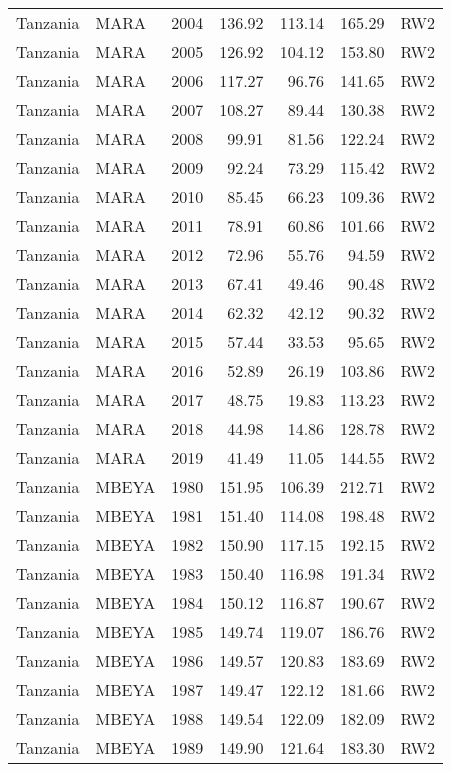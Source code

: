 \begin{longtable}{lllrrrl}
  Tanzania & MARA & 2004 & 136.92 & 113.14 & 165.29 & RW2 \\ 
  Tanzania & MARA & 2005 & 126.92 & 104.12 & 153.80 & RW2 \\ 
  Tanzania & MARA & 2006 & 117.27 & 96.76 & 141.65 & RW2 \\ 
  Tanzania & MARA & 2007 & 108.27 & 89.44 & 130.38 & RW2 \\ 
  Tanzania & MARA & 2008 & 99.91 & 81.56 & 122.24 & RW2 \\ 
  Tanzania & MARA & 2009 & 92.24 & 73.29 & 115.42 & RW2 \\ 
  Tanzania & MARA & 2010 & 85.45 & 66.23 & 109.36 & RW2 \\ 
  Tanzania & MARA & 2011 & 78.91 & 60.86 & 101.66 & RW2 \\ 
  Tanzania & MARA & 2012 & 72.96 & 55.76 & 94.59 & RW2 \\ 
  Tanzania & MARA & 2013 & 67.41 & 49.46 & 90.48 & RW2 \\ 
  Tanzania & MARA & 2014 & 62.32 & 42.12 & 90.32 & RW2 \\ 
  Tanzania & MARA & 2015 & 57.44 & 33.53 & 95.65 & RW2 \\ 
  Tanzania & MARA & 2016 & 52.89 & 26.19 & 103.86 & RW2 \\ 
  Tanzania & MARA & 2017 & 48.75 & 19.83 & 113.23 & RW2 \\ 
  Tanzania & MARA & 2018 & 44.98 & 14.86 & 128.78 & RW2 \\ 
  Tanzania & MARA & 2019 & 41.49 & 11.05 & 144.55 & RW2 \\ 
  Tanzania & MBEYA & 1980 & 151.95 & 106.39 & 212.71 & RW2 \\ 
  Tanzania & MBEYA & 1981 & 151.40 & 114.08 & 198.48 & RW2 \\ 
  Tanzania & MBEYA & 1982 & 150.90 & 117.15 & 192.15 & RW2 \\ 
  Tanzania & MBEYA & 1983 & 150.40 & 116.98 & 191.34 & RW2 \\ 
  Tanzania & MBEYA & 1984 & 150.12 & 116.87 & 190.67 & RW2 \\ 
  Tanzania & MBEYA & 1985 & 149.74 & 119.07 & 186.76 & RW2 \\ 
  Tanzania & MBEYA & 1986 & 149.57 & 120.83 & 183.69 & RW2 \\ 
  Tanzania & MBEYA & 1987 & 149.47 & 122.12 & 181.66 & RW2 \\ 
  Tanzania & MBEYA & 1988 & 149.54 & 122.09 & 182.09 & RW2 \\ 
  Tanzania & MBEYA & 1989 & 149.90 & 121.64 & 183.30 & RW2 \\ 

\end{longtable}
